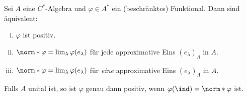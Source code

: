 \begin{satz}[label=satz:54,{name=[Äquivalenzen zur Positivität von Funktionalen]}]
	Sei $A$ eine $C^*$-Algebra und $\varphi \in A^*$ ein (beschränktes) Funktional. Dann sind äquivalent:
	\begin{enumerate}[(i),itemsep=0pt]
		\item $\varphi$ ist positiv.
		\item $\norm*{\varphi} = \lim_\lambda\varphi(e_\lambda)$ für jede approximative Eins $(e_\lambda)_\Lambda$ in $A$.
		\item $\norm*{\varphi} = \lim_\lambda\varphi(e_\lambda)$ für \emph{eine} approximative Eins $(e_\lambda)_\Lambda$ in $A$.
	\end{enumerate}
	Falls $A$ unital ist, so ist $\varphi$ genau dann positiv, wenn $\varphi(\ind)=\norm*{\varphi}$ ist.
\end{satz}
